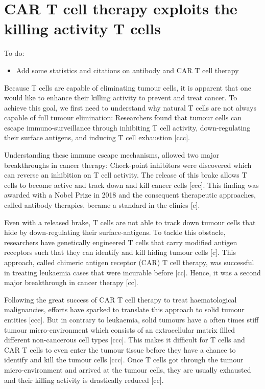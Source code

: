 \documentclass{report}
\begin{document}
\section{CAR T cell therapy exploits the killing activity T cells}

To-do:
\begin{itemize}
	\item Add some statistics and citations on antibody and CAR T cell therapy
\end{itemize}

Because T cells are capable of eliminating tumour cells, it is apparent that one would like to enhance their killing activity to prevent and treat cancer. To achieve this goal, we first need to understand why natural T cells are not always capable of full tumour elimination: Researchers found that tumour cells can escape immuno-surveillance through inhibiting T cell activity, down-regulating their surface antigens, and inducing T cell exhaustion [ccc]. 

Understanding these immune escape mechanisms, allowed two major breakthroughs in cancer therapy: 
Check-point inhibitors were discovered which can reverse an inhibition on T cell activity. The release of this brake allows T cells to become active and track down and kill cancer cells [ccc]. This finding was awarded with a Nobel Prize in 2018 and the consequent therapeutic approaches, called antibody therapies, became a standard in the clinics [c]. 

Even with a released brake, T cells are not able to track down tumour cells that hide by down-regulating their surface-antigens. To tackle this obstacle, researchers have genetically engineered T cells that  carry modified antigen receptors such that they can identify and kill hiding tumour cells [c]. This approach, called chimeric antigen receptor (CAR) T cell therapy, was successful in treating leukaemia cases that were incurable before [cc]. Hence, it was a second major breakthrough in cancer therapy [cc]. 

Following the great success of CAR T cell therapy to treat haematological malignancies, efforts have sparked to translate this approach to solid tumour entities [ccc]. But in contrary to leukaemia, solid tumours have a often times stiff tumour micro-environment which consists of an extracellular matrix filled different non-cancerous cell types [ccc]. This makes it difficult for T cells and CAR T cells to even enter the tumour tissue before they have a chance to identify and kill the tumour cells [ccc]. Once T cells got through the tumour micro-environment and arrived at the tumour cells, they are usually exhausted and their killing activity is drastically reduced [cc]. 
\end{document}
